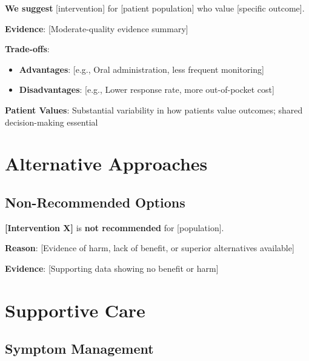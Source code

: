 \documentclass[10pt,letterpaper]{article}
\begin{document}
\begin{tcolorbox}[enhanced,colback=conditionalyellow!10,colframe=conditionalyellow,
title={\textbf{RECOMMENDATION} \hfill \textbf{GRADE: 2B}},
fonttitle=\bfseries\small,coltitle=black]
{\small
\textbf{We suggest} [intervention] for [patient population] who value [specific outcome].

\textbf{Evidence}: [Moderate-quality evidence summary]

\textbf{Trade-offs}:
\begin{itemize}
\item \textbf{Advantages}: [e.g., Oral administration, less frequent monitoring]
\item \textbf{Disadvantages}: [e.g., Lower response rate, more out-of-pocket cost]
\end{itemize}

\textbf{Patient Values}: Substantial variability in how patients value outcomes; shared decision-making essential
}
\end{tcolorbox}

\section{Alternative Approaches}

\subsection{Non-Recommended Options}

\begin{tcolorbox}[enhanced,colback=warningred!10,colframe=warningred,
title={\textbf{NOT RECOMMENDED}},
fonttitle=\bfseries\small,coltitle=white,colbacktitle=warningred]
{\small
\textbf{[Intervention X]} is \textbf{not recommended} for [population].

\textbf{Reason}: [Evidence of harm, lack of benefit, or superior alternatives available]

\textbf{Evidence}: [Supporting data showing no benefit or harm]
}
\end{tcolorbox}

\section{Supportive Care}

\subsection{Symptom Management}
\end{document}

